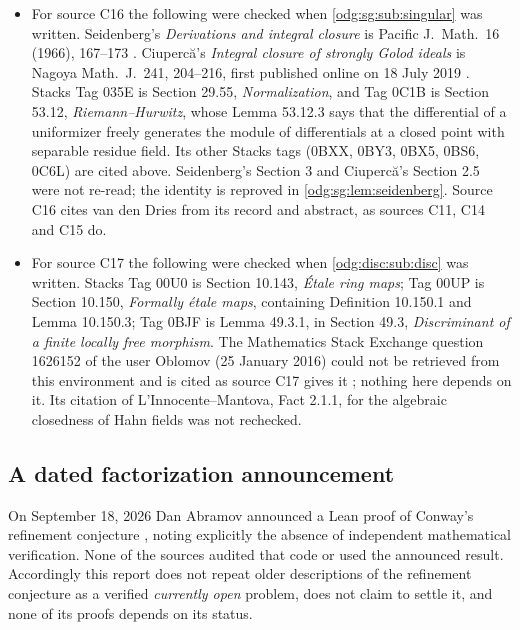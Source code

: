 \documentclass[11pt,oneside]{article}
\numberwithin{equation}{section}
\theoremstyle{definition}
\theoremstyle{remark}
\begin{document}
\begin{itemize}[leftmargin=*]
Milne's \emph{Abelian Varieties} (Chapter III, Proposition 2.3; Chapter IV, Proposition
6.4) were not rechecked.
\item For source C16 the following were checked when \cref{odg:sg:sub:singular} was
written. Seidenberg's \emph{Derivations and integral closure} is Pacific J.\ Math.\ 16 (1966),
167--173 \cite{Seidenberg}. Ciuperc\u{a}'s \emph{Integral closure of strongly Golod ideals} is
Nagoya Math.\ J.\ 241, 204--216, first published online on 18 July 2019 \cite{Ciuperca}.
Stacks Tag 035E is Section 29.55, \emph{Normalization}, and Tag 0C1B is Section 53.12,
\emph{Riemann--Hurwitz}, whose Lemma 53.12.3 says that the differential of a uniformizer
freely generates the module of differentials at a closed point with separable residue
field. Its other Stacks tags (0BXX, 0BY3, 0BX5, 0BS6, 0C6L) are cited above. Seidenberg's
Section 3 and Ciuperc\u{a}'s Section 2.5 were not re-read; the identity is reproved in
\cref{odg:sg:lem:seidenberg}. Source C16 cites van den Dries from its record and abstract, as
sources C11, C14 and C15 do.
\item For source C17 the following were checked when \cref{odg:disc:sub:disc} was written.
Stacks Tag 00U0 is Section 10.143, \emph{\'Etale ring maps}; Tag 00UP is Section 10.150,
\emph{Formally \'etale maps}, containing Definition 10.150.1 and Lemma 10.150.3; Tag 0BJF is
Lemma 49.3.1, in Section 49.3, \emph{Discriminant of a finite locally free morphism}. The
Mathematics Stack Exchange question 1626152 of the user Oblomov (25 January 2016) could not
be retrieved from this environment and is cited as source C17 gives it
\cite{Oblomov}; nothing here depends on it. Its citation of L'Innocente--Mantova, Fact 2.1.1,
for the algebraic closedness of Hahn fields was not rechecked.
\end{itemize}

\subsection{A dated factorization announcement}

On September 18, 2026 Dan Abramov announced a Lean proof of Conway's
refinement conjecture \cite{Abramov,AbramovRepo}, noting explicitly the
absence of independent mathematical verification. None of the sources audited
that code or used the announced result. Accordingly this report does not
repeat older descriptions of the refinement conjecture as a verified
\emph{currently open} problem, does not claim to settle it, and none of its
proofs depends on its status.
\end{document}
